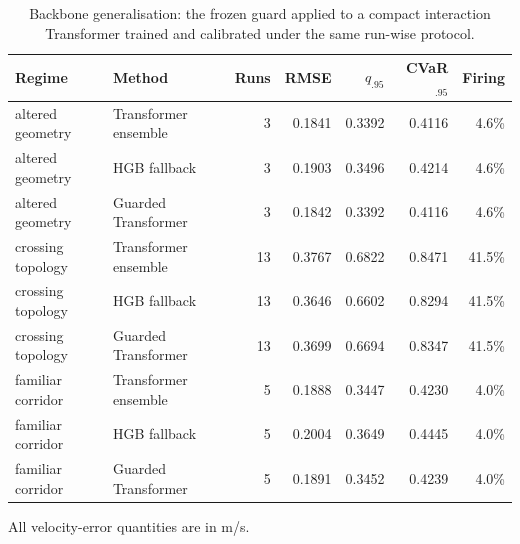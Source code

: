 \begin{table}[!htbp]
\centering
\caption{Backbone generalisation: the frozen guard applied to a compact interaction Transformer trained and calibrated under the same run-wise protocol.}
\label{tab:r3-transformer}
\small
\setlength{\tabcolsep}{4.2pt}
\renewcommand{\arraystretch}{1.08}
\begin{tabular}{llrrrrr}
\toprule
Regime & Method & Runs & RMSE & $q_{.95}$ & CVaR$_{.95}$ & Firing \\
\midrule
altered geometry & Transformer ensemble & 3 & 0.1841 & 0.3392 & 0.4116 & 4.6\% \\
altered geometry & HGB fallback & 3 & 0.1903 & 0.3496 & 0.4214 & 4.6\% \\
altered geometry & Guarded Transformer & 3 & 0.1842 & 0.3392 & 0.4116 & 4.6\% \\
crossing topology & Transformer ensemble & 13 & 0.3767 & 0.6822 & 0.8471 & 41.5\% \\
crossing topology & HGB fallback & 13 & 0.3646 & 0.6602 & 0.8294 & 41.5\% \\
crossing topology & Guarded Transformer & 13 & 0.3699 & 0.6694 & 0.8347 & 41.5\% \\
familiar corridor & Transformer ensemble & 5 & 0.1888 & 0.3447 & 0.4230 & 4.0\% \\
familiar corridor & HGB fallback & 5 & 0.2004 & 0.3649 & 0.4445 & 4.0\% \\
familiar corridor & Guarded Transformer & 5 & 0.1891 & 0.3452 & 0.4239 & 4.0\% \\
\bottomrule
\end{tabular}
\par\vspace{2pt}\footnotesize All velocity-error quantities are in m/s.
\end{table}
